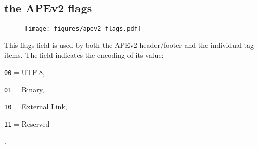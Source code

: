 \subsection{the APEv2 flags}
\begin{figure}[h]
\texttt{[image: figures/apev2\_flags.pdf]}
\end{figure}
\par
\noindent
This flags field is used by both the APEv2 header/footer and the
individual tag items.
The  field indicates the encoding of its value:

\begin{inparaenum}
\item[\texttt{00} = ] UTF-8,
\item[\texttt{01} = ] Binary,
\item[\texttt{10} = ] External Link,
\item[\texttt{11} = ] Reserved
\end{inparaenum}
.
